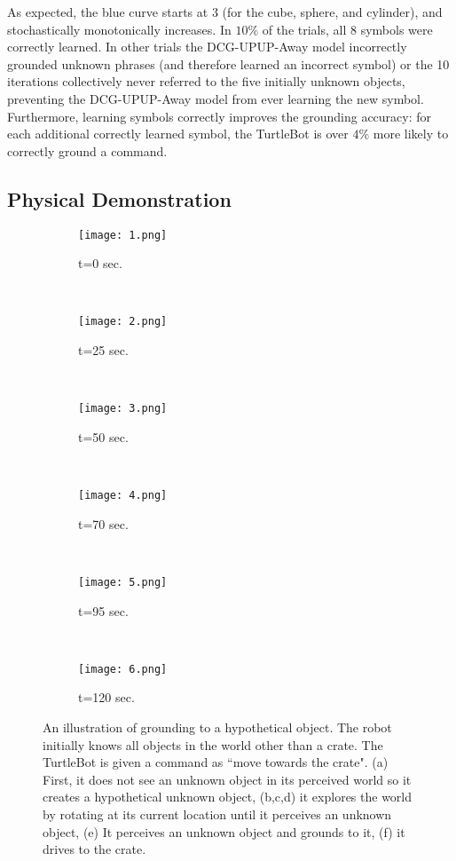 As expected, the blue curve starts at $3$ (for the cube, sphere, and cylinder), and stochastically monotonically increases.
In $10\%$ of the trials, all $8$ symbols were correctly learned. In other trials the DCG-UPUP-Away model incorrectly grounded unknown phrases (and therefore learned an incorrect symbol) or the 10 iterations collectively never referred to the five initially unknown objects, preventing the DCG-UPUP-Away model from ever learning the new symbol.
Furthermore, learning symbols correctly improves the grounding accuracy: for each additional correctly learned symbol, the TurtleBot is over $4\%$ more likely to correctly ground a command. %

\subsection{Physical Demonstration}
\begin{figure*}[t!]
\begin{subfigure}[b]{0.155\textwidth}
\centering
\texttt{[image: 1.png]}
\caption{t=0 sec.}
\label{fig:exp1}
\end{subfigure}
~
\begin{subfigure}[b]{0.155\textwidth}
\centering
\texttt{[image: 2.png]}
\caption{t=25 sec.}
\label{fig:exp2}
\end{subfigure}
~
\begin{subfigure}[b]{0.155\textwidth}
\centering
\texttt{[image: 3.png]}
\caption{t=50 sec.}
\label{fig:exp3}
\end{subfigure}
~
\begin{subfigure}[b]{0.155\textwidth}
\centering
\texttt{[image: 4.png]}
\caption{t=70 sec.}
\label{fig:exp4}
\end{subfigure}
~
\begin{subfigure}[b]{0.155\textwidth}
\centering
\texttt{[image: 5.png]}
\caption{t=95 sec.}
\label{fig:exp5}
\end{subfigure}
~
\begin{subfigure}[b]{0.155\textwidth}
\centering
\texttt{[image: 6.png]}
\caption{t=120 sec. }
\label{fig:exp6}
\end{subfigure}
\caption{An illustration of grounding to a hypothetical object. The robot initially knows all objects in the world other than a crate. The TurtleBot is given a command as ``move towards the crate". (a) First, it does not see an unknown object in its perceived world so it creates a hypothetical unknown object, (b,c,d) it explores the world by rotating at its current location until it perceives an unknown object, (e) It perceives an unknown object and grounds to it, (f) it drives to the crate.}
\label{fig:crate}
\end{figure*}
